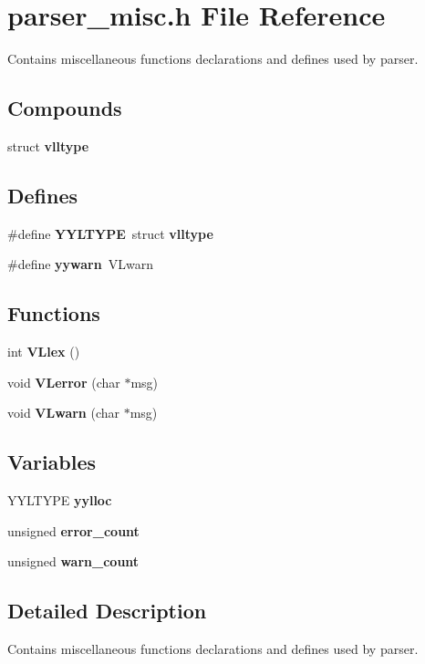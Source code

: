 \section{parser\_\-misc.h File Reference}
\label{parser__misc_8h}
Contains miscellaneous functions declarations and defines used by parser. 


\subsection*{Compounds}
\begin{CompactItemize}
\item 
struct {\bf vlltype}
\end{CompactItemize}
\subsection*{Defines}
\begin{CompactItemize}
\item 
\#define {\bf YYLTYPE}\ struct {\bf vlltype}
\item 
\#define {\bf yywarn}\ VLwarn
\end{CompactItemize}
\subsection*{Functions}
\begin{CompactItemize}
\item 
int {\bf VLlex} ()
\item 
void {\bf VLerror} (char $\ast$msg)
\item 
void {\bf VLwarn} (char $\ast$msg)
\end{CompactItemize}
\subsection*{Variables}
\begin{CompactItemize}
\item 
YYLTYPE {\bf yylloc}
\item 
unsigned {\bf error\_\-count}
\item 
unsigned {\bf warn\_\-count}
\end{CompactItemize}


\subsection{Detailed Description}
Contains miscellaneous functions declarations and defines used by parser.

